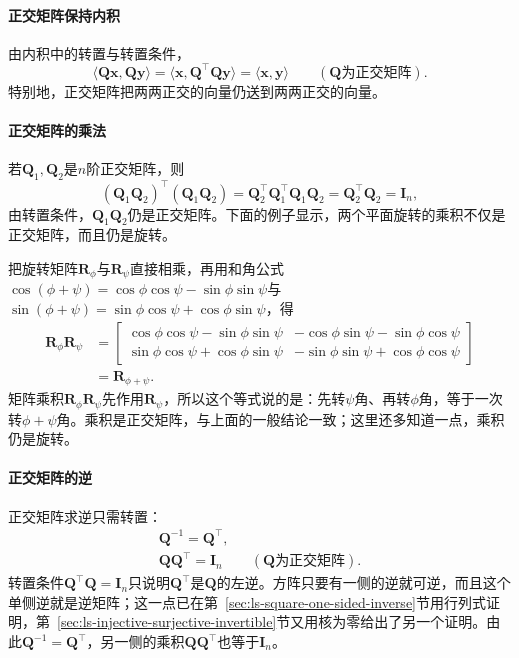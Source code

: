 \paragraph{正交矩阵保持内积}
由内积中的转置与转置条件，
\[
 \langle\bm Q\bm x,\bm Q\bm y\rangle=\langle\bm x,\bm Q^\top\bm Q\bm y\rangle=\langle\bm x,\bm y\rangle\qquad(\bm Q\text{为正交矩阵}).
\]
特别地，正交矩阵把两两正交的向量仍送到两两正交的向量。

\paragraph{正交矩阵的乘法}
若$\bm Q_1,\bm Q_2$是$n$阶正交矩阵，则
\[
 (\bm Q_1\bm Q_2)^\top(\bm Q_1\bm Q_2)=\bm Q_2^\top\bm Q_1^\top\bm Q_1\bm Q_2=\bm Q_2^\top\bm Q_2=\bm I_n,
\]
由转置条件，$\bm Q_1\bm Q_2$仍是正交矩阵。下面的例子显示，两个平面旋转的乘积不仅是正交矩阵，而且仍是旋转。
\begin{example}[两个平面旋转的乘积]
\label{ex:ls-rotation-composition}
把旋转矩阵$\bm R_\phi$与$\bm R_\psi$直接相乘，再用和角公式$\cos(\phi+\psi)=\cos\phi\cos\psi-\sin\phi\sin\psi$与$\sin(\phi+\psi)=\sin\phi\cos\psi+\cos\phi\sin\psi$，得
\[
 \begin{aligned}
 \bm R_\phi\bm R_\psi
 &=\begin{bmatrix}\cos\phi\cos\psi-\sin\phi\sin\psi&-\cos\phi\sin\psi-\sin\phi\cos\psi\\\sin\phi\cos\psi+\cos\phi\sin\psi&-\sin\phi\sin\psi+\cos\phi\cos\psi\end{bmatrix}\\
 &=\bm R_{\phi+\psi}.
 \end{aligned}
\]
矩阵乘积$\bm R_\phi\bm R_\psi$先作用$\bm R_\psi$，所以这个等式说的是：先转$\psi$角、再转$\phi$角，等于一次转$\phi+\psi$角。乘积是正交矩阵，与上面的一般结论一致；这里还多知道一点，乘积仍是旋转。
\end{example}

\paragraph{正交矩阵的逆}
正交矩阵求逆只需转置：
\[
\begin{gathered}
\bm Q^{-1}=\bm Q^\top,\\
\bm Q\bm Q^\top=\bm I_n\qquad(\bm Q\text{为正交矩阵}).
\end{gathered}
\]
转置条件$\bm Q^\top\bm Q=\bm I_n$只说明$\bm Q^\top$是$\bm Q$的左逆。方阵只要有一侧的逆就可逆，而且这个单侧逆就是逆矩阵；这一点已在第~\ref{sec:ls-square-one-sided-inverse}节用行列式证明，第~\ref{sec:ls-injective-surjective-invertible}节又用核为零给出了另一个证明。由此$\bm Q^{-1}=\bm Q^\top$，另一侧的乘积$\bm Q\bm Q^\top$也等于$\bm I_n$。

